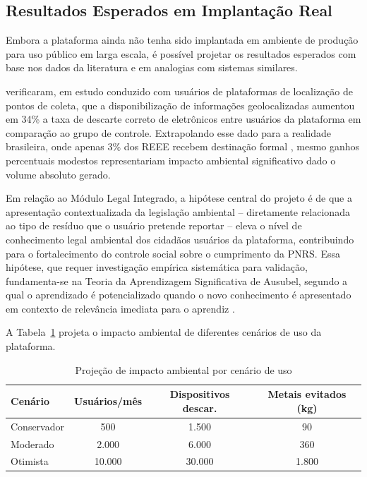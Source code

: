 \documentclass[12pt, a4paper]{article}
\numberwithin{equation}{section}
\numberwithin{figure}{section}
\numberwithin{table}{section}
\begin{document}
\subsection{Resultados Esperados em Implantação Real}

Embora a plataforma ainda não tenha sido implantada em ambiente de produção
para uso público em larga escala, é possível projetar os resultados esperados
com base nos dados da literatura e em analogias com sistemas similares.

 verificaram, em estudo conduzido com usuários de
plataformas de localização de pontos de coleta, que a disponibilização de
informações geolocalizadas aumentou em 34\% a taxa de descarte correto de
eletrônicos entre usuários da plataforma em comparação ao grupo de controle.
Extrapolando esse dado para a realidade brasileira, onde apenas 3\% dos REEE
recebem destinação formal \cite{abrelpe2023}, mesmo ganhos percentuais modestos
representariam impacto ambiental significativo dado o volume absoluto gerado.

Em relação ao Módulo Legal Integrado, a hipótese central do projeto é de que
a apresentação contextualizada da legislação ambiental -- diretamente relacionada
ao tipo de resíduo que o usuário pretende reportar -- eleva o nível de
conhecimento legal ambiental dos cidadãos usuários da plataforma, contribuindo
para o fortalecimento do controle social sobre o cumprimento da PNRS.
Essa hipótese, que requer investigação empírica sistemática para validação,
fundamenta-se na Teoria da Aprendizagem Significativa de Ausubel, segundo a
qual o aprendizado é potencializado quando o novo conhecimento é apresentado
em contexto de relevância imediata para o aprendiz \cite{ausubel2000}.

A Tabela~\ref{tab:impacto_estimado} projeta o impacto ambiental de diferentes
cenários de uso da plataforma.

\begin{table}[H]
  \centering
  \caption{Projeção de impacto ambiental por cenário de uso}
  \label{tab:impacto_estimado}
  \begin{tabular}{|l|c|c|c|}
    \hline
    \textbf{Cenário} &
    \textbf{Usuários/mês} &
    \textbf{Dispositivos descar.} &
    \textbf{Metais evitados (kg)} \\
    \hline
    Conservador   & 500    & 1.500  & 90   \\
    Moderado      & 2.000  & 6.000  & 360  \\
    Otimista      & 10.000 & 30.000 & 1.800 \\
    \hline
  \end{tabular}
\end{table}
\end{document}
